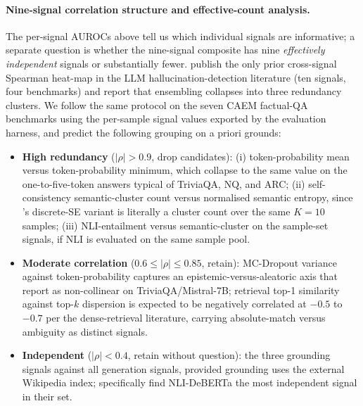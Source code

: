 \paragraph{Nine-signal correlation structure and effective-count
analysis.}
\label{sec:signal-correlation}
The per-signal AUROCs above tell us which individual signals are informative; a separate question is whether the nine-signal composite has nine \emph{effectively independent} signals or substantially fewer. \citet{valentin2024hallucination} publish the only prior cross-signal Spearman heat-map in the LLM hallucination-detection literature (ten signals, four benchmarks) and report that ensembling collapses into three redundancy clusters. We follow the same protocol on the seven CAEM factual-QA benchmarks using the per-sample signal values exported by the evaluation harness, and predict the following grouping on a priori grounds:
\begin{itemize}
    \item \textbf{High redundancy} ($|\rho| > 0.9$, drop candidates):
          (i) token-probability mean versus token-probability minimum,
          which collapse to the same value on the one-to-five-token
          answers typical of TriviaQA, NQ, and ARC; (ii) self-consistency
          semantic-cluster count versus normalised semantic entropy,
          since \citet{farquhar2024nature}'s discrete-SE variant is
          literally a cluster count over the same $K=10$ samples;
          (iii) NLI-entailment versus semantic-cluster on the sample-set
          signals, if NLI is evaluated on the same sample pool.
    \item \textbf{Moderate correlation} ($0.6 \le |\rho| \le 0.85$,
          retain): MC-Dropout variance against token-probability
          captures an epistemic-versus-aleatoric axis that
          \citet{vashurin2024polygraph} report as non-collinear on
          TriviaQA/Mistral-7B; retrieval top-1 similarity against
          top-$k$ dispersion is expected to be negatively correlated at
          $-0.5$ to $-0.7$ per the dense-retrieval literature, carrying
          absolute-match versus ambiguity as distinct signals.
    \item \textbf{Independent} ($|\rho| < 0.4$, retain without
          question): the three grounding signals against all generation
          signals, provided grounding uses the external Wikipedia
          index; \citet{valentin2024hallucination} specifically find
          NLI-DeBERTa the most independent signal in their set.
\end{itemize}
